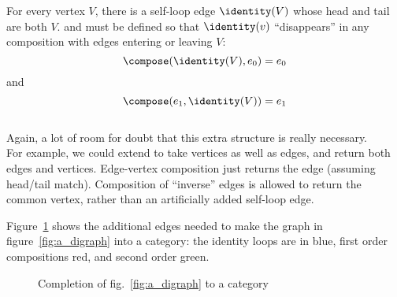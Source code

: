 \documentclass[11pt,openany]{book}
\begin{document}
\begin{definition}
\begin{description}
For every vertex $V$, there is a self-loop edge 
$\identity(V)$ whose head and tail
are both $V$.
\compose and \identity
must be defined so that  $\identity(v)$ 
``disappears'' in any composition with edges 
entering or leaving $V$:
\[ 
\compose(\identity(V),e_0) = e_0 \]
and
\[ \compose(e_1,\identity(V)) = e_1 \]
\\
Again, a lot of room for doubt that this extra structure 
is really necessary.
\\
For example, we could extend \compose 
to take vertices as well as edges,
and return both edges and vertices.
Edge-vertex composition just returns the edge (assuming head/tail match).
Composition of ``inverse'' edges is allowed to return the common vertex,
rather than an artificially added self-loop edge.
\end{description}
\end{definition}

Figure~\ref{fig:a_completed_digraph} shows the additional
edges needed to make the graph in figure~\ref{fig:a_digraph}
into a category: the identity loops are in blue, first order
compositions red, and second order green.

\begin{figure}
\centering
{}
\caption{Completion of fig.~\ref{fig:a_digraph}
to a category}
\label{fig:a_completed_digraph}
\end{figure}
\end{document}

